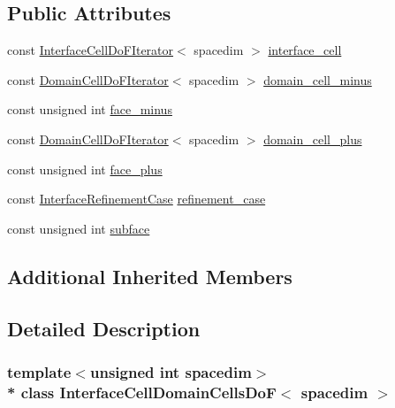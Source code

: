 \subsection*{Public Attributes}
\begin{DoxyCompactItemize}
\item 
const \hyperlink{class_interface_cell_do_f_iterator}{Interface\+Cell\+Do\+F\+Iterator}$<$ spacedim $>$ \hyperlink{class_interface_cell_domain_cells_do_f_a5fe7922af91545598d89c77ba42a59da}{interface\+\_\+cell}
\item 
const \hyperlink{class_domain_cell_do_f_iterator}{Domain\+Cell\+Do\+F\+Iterator}$<$ spacedim $>$ \hyperlink{class_interface_cell_domain_cells_do_f_ac8c84df4298d2d5be54dc8bf81e48c4b}{domain\+\_\+cell\+\_\+minus}
\item 
const unsigned int \hyperlink{class_interface_cell_domain_cells_do_f_a01fc12497d44b06c7a325ea8f0b2ad28}{face\+\_\+minus}
\item 
const \hyperlink{class_domain_cell_do_f_iterator}{Domain\+Cell\+Do\+F\+Iterator}$<$ spacedim $>$ \hyperlink{class_interface_cell_domain_cells_do_f_a8fd9dbd3a1e53023ecca7917b004bab1}{domain\+\_\+cell\+\_\+plus}
\item 
const unsigned int \hyperlink{class_interface_cell_domain_cells_do_f_afcb7abea75dfc6e310493a6ff9aadcf6}{face\+\_\+plus}
\item 
const \hyperlink{triangulation__system_8h_a4cfb8c5e21535951e919b6a6b1023af7}{Interface\+Refinement\+Case} \hyperlink{class_interface_cell_domain_cells_do_f_aebb7e5f13d079fc83f98f67bcfcc6de3}{refinement\+\_\+case}
\item 
const unsigned int \hyperlink{class_interface_cell_domain_cells_do_f_ac0f33cbe60afdc4f5856ea39a085ed1a}{subface}
\end{DoxyCompactItemize}
\subsection*{Additional Inherited Members}


\subsection{Detailed Description}
\subsubsection*{template$<$unsigned int spacedim$>$\\*
class Interface\+Cell\+Domain\+Cells\+Do\+F$<$ spacedim $>$}

